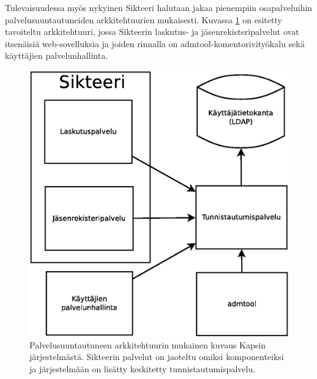 Tulevaisuudessa myös nykyinen Sikteeri halutaan jakaa pienempiin osapalveluihin palvelusuuntautuneiden arkkitehtuurien mukaisesti. Kuvassa \ref{kapsi_uusi} on esitetty tavoiteltu arkkitehtuuri, jossa Sikteerin laskutus- ja jäsenrekisteripalvelut ovat itsenäisiä web-sovelluksia ja joiden rinnalla on admtool-komentorivityökalu sekä käyttäjien palvelunhallinta.

\begin{figure}[ht]
\centering
\includegraphics[width=.6\textwidth]{toteutus/muutostarve/kapsi_uusi_soa.eps}
\caption{Palvelusuuntautuneen arkkitehtuurin mukainen kuvaus Kapsin järjestelmästä. Sikteerin palvelut on jaoteltu omiksi komponenteiksi ja järjestelmään on lisätty keskitetty tunnistautumispalvelu.}%
\label{kapsi_uusi}
\end{figure}